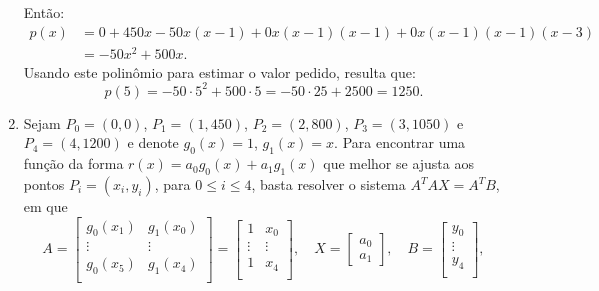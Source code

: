\documentclass[12pt,a4paper]{article}
\begin{document}
\begin{ExerciseList}
\begin{enumerate}
Então:
\begin{align*}
p(x)
&=0
 +450 x
 -50  x(x-1)
 +0   x(x-1)(x-1)
 +0   x(x-1)(x-1)(x-3)\\
& = -50x^2 + 500x.
\end{align*}
Usando este polinômio para estimar o valor pedido, resulta que:
\[
p(5)
=-50\cdot 5^2 + 500\cdot 5
=-50\cdot 25 + 2500
= 1250.
\]
\item Sejam $P_0 = (0,0)$, $P_1 = (1,450)$, $P_2 = (2,800)$, $P_3 = (3,1050)$ e $P_4 = (4,1200)$ e denote $g_0(x) = 1$, $g_1(x) = x$. Para encontrar uma função da forma $r(x) = a_0 g_0(x) + a_1 g_1(x)$ que melhor se ajusta aos pontos $P_i = (x_i,y_i)$, para $0 \leq i \leq 4$, basta resolver o sistema $A^T A X = A^T B$, em que
\[
A
= \begin{bmatrix}
g_0(x_1) & g_1(x_0) \\
\vdots & \vdots\\
g_0(x_5) & g_1(x_4) \\
\end{bmatrix}
= \begin{bmatrix}
1 & x_0 \\
\vdots & \vdots\\
1 & x_4 \\
\end{bmatrix},
\quad
X =
\begin{bmatrix}
a_0\\a_1
\end{bmatrix},
\quad
B = \begin{bmatrix}
y_0 \\
\vdots \\
y_4 \\
\end{bmatrix},
\]


\end{enumerate}
\end{ExerciseList}
\end{document}
